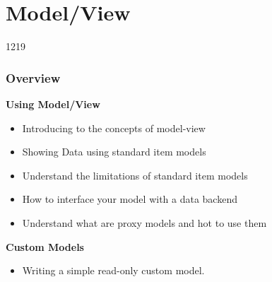 %
%
%
%

\section{Model/View}

\begin{slide}{1219}
  \label{model-view-programming}
  \frametitle{Overview}
  
  \textbf{Using Model/View} 
  \begin{itemize}
  \item Introducing to the concepts of model-view
  \item Showing Data using standard item models
  \item Understand the limitations of standard item models
  \item How to interface your model with a data backend
  \item Understand what are proxy models and hot to use them
 \end{itemize}
  \textbf{Custom Models} 
  \begin{itemize}
  \item Writing a simple read-only custom model.
 \end{itemize}
\end{slide}





%
%
